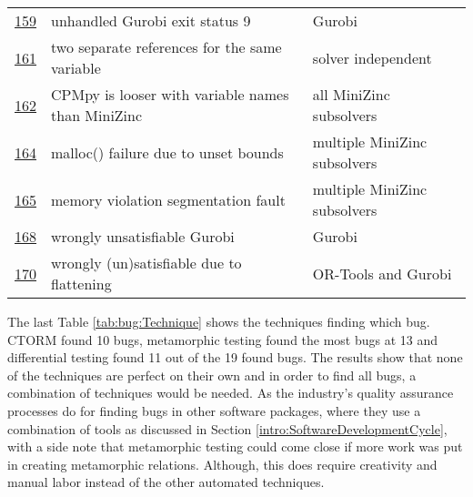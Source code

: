 \begin{table}[]
\begin{tabular}{lll}
		\href{https://github.com/CPMpy/cpmpy/issues/159}{159} & unhandled Gurobi exit status 9                    & Gurobi                       \\
		\href{https://github.com/CPMpy/cpmpy/issues/161}{161} & two separate references for the same variable     & solver independent           \\
		\href{https://github.com/CPMpy/cpmpy/issues/162}{162} & CPMpy is looser with variable names than MiniZinc & all MiniZinc subsolvers      \\
		\href{https://github.com/CPMpy/cpmpy/issues/164}{164} & malloc() failure due to unset bounds              & multiple MiniZinc subsolvers \\
		\href{https://github.com/CPMpy/cpmpy/issues/165}{165} & memory violation segmentation fault               & multiple MiniZinc subsolvers \\
		\href{https://github.com/CPMpy/cpmpy/issues/168}{168} & wrongly unsatisfiable Gurobi                      & Gurobi                       \\
		\href{https://github.com/CPMpy/cpmpy/issues/170}{170} & wrongly (un)satisfiable due to flattening         & OR-Tools and Gurobi          \\ \bottomrule
	\end{tabular}
\end{table}

\label{res:TechniqueToFindBug}
The last Table \ref{tab:bug:Technique} shows the techniques finding which bug. CTORM found 10 bugs, metamorphic testing found the most bugs at 13 and differential testing found 11 out of the 19 found bugs. The results show that none of the techniques are perfect on their own and in order to find all bugs, a combination of techniques would be needed. As the industry’s quality assurance processes do for finding bugs in other software packages, where they use a combination of tools as discussed in Section \ref{intro:SoftwareDevelopmentCycle}, with a side note that metamorphic testing could come close if more work was put in creating metamorphic relations. Although, this does require creativity and manual labor instead of the other automated techniques.

